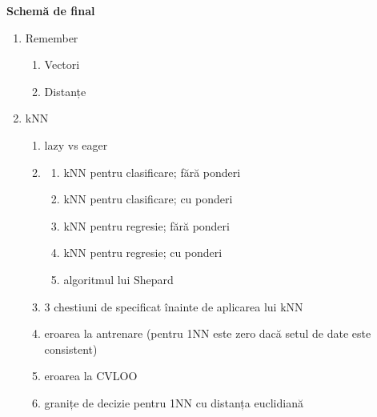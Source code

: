 \documentclass[12pt]{article}
\begin{document}
	
	\newpage
	\textbf{\large{Schemă de final}}
	\begin{enumerate}
		\item Remember
		\begin{enumerate}
			\item Vectori
			\item Distanțe
		\end{enumerate}
		\item kNN
		\begin{enumerate}
			\item lazy vs eager
			\item
			\begin{enumerate}
				\item kNN pentru clasificare; fără ponderi
				\item kNN pentru clasificare; cu ponderi
				\item kNN pentru regresie; fără ponderi
				\item kNN pentru regresie; cu ponderi
				\item algoritmul lui Shepard
			\end{enumerate}
			\item 3 chestiuni de specificat înainte de aplicarea lui kNN
			\item eroarea la antrenare (pentru 1NN este zero dacă setul  de date este consistent)
			\item eroarea la CVLOO
			\item granițe de decizie pentru 1NN cu distanța euclidiană
		\end{enumerate}
	\end{enumerate}
	

	
\end{document}
